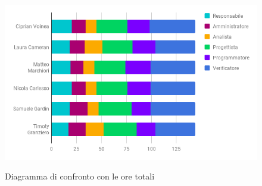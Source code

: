 			\begin{figure}[H]
					\centering
					\includegraphics[scale=0.7]{img/Ore_Totali.png}\\
					\caption{Diagramma di confronto con le ore totali}
			\end{figure}
